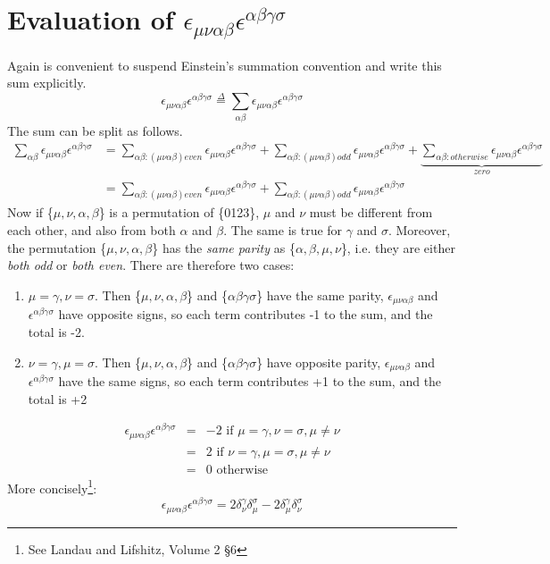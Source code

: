 \documentclass[10pt,a4paper]{article}
\begin{document}
	\section{Evaluation of $\epsilon_{\mu\nu\alpha\beta}\epsilon^{\alpha\beta\gamma\sigma}$}
	Again is convenient to suspend Einstein's summation convention and write this sum explicitly.
	$$
	\epsilon_{\mu\nu\alpha\beta}\epsilon^{\alpha\beta\gamma\sigma}\overset{\Delta}{=}\sum_{\alpha\beta}\epsilon_{\mu\nu\alpha\beta}\epsilon^{\alpha\beta\gamma\sigma}
	$$
	The sum can be split as follows.
	\begin{align*}
	\sum_{\alpha\beta}\epsilon_{\mu\nu\alpha\beta}\epsilon^{\alpha\beta\gamma\sigma} &= \sum_{\alpha\beta: (\mu\nu\alpha\beta) even}\epsilon_{\mu\nu\alpha\beta}\epsilon^{\alpha\beta\gamma\sigma}
	+ \sum_{\alpha\beta: (\mu\nu\alpha\beta) odd}\epsilon_{\mu\nu\alpha\beta}\epsilon^{\alpha\beta\gamma\sigma}
	+ \underbrace{\sum_{\alpha\beta: otherwise}\epsilon_{\mu\nu\alpha\beta}\epsilon^{\alpha\beta\gamma\sigma}}_{zero}\\
	&= \sum_{\alpha\beta: (\mu\nu\alpha\beta) even}\epsilon_{\mu\nu\alpha\beta}\epsilon^{\alpha\beta\gamma\sigma}
	+ \sum_{\alpha\beta: (\mu\nu\alpha\beta) odd}\epsilon_{\mu\nu\alpha\beta}\epsilon^{\alpha\beta\gamma\sigma}
	\end{align*}
	Now if \{$\mu,\nu,\alpha,\beta$\} is a permutation of \{0123\}, $\mu$ and $\nu$ must be different from each other, and also from both $\alpha$ and  $\beta$. The same is true for $\gamma$ and $\sigma$. Moreover,  the permutation  \{$\mu,\nu,\alpha,\beta$\} has the \emph{same parity} as \{$\alpha,\beta,\mu,\nu$\}, i.e. they are either \emph{both odd} or \emph{both even}. There are therefore two cases:
	\begin{enumerate}
		\item $\mu=\gamma,\nu=\sigma$. Then \{$\mu,\nu,\alpha,\beta$\} and \{$\alpha\beta\gamma\sigma$\} have the same parity, $\epsilon_{\mu\nu\alpha\beta}$ and $\epsilon^{\alpha\beta\gamma\sigma}$ have opposite signs, so each term contributes -1 to the sum, and the total is -2.
		\item $\nu=\gamma,\mu=\sigma$. Then \{$\mu,\nu,\alpha,\beta$\} and \{$\alpha\beta\gamma\sigma$\} have opposite parity, $\epsilon_{\mu\nu\alpha\beta}$ and $\epsilon^{\alpha\beta\gamma\sigma}$ have the same signs, so each term contributes +1 to the sum, and the total is +2 
	\end{enumerate}
	
	\begin{align*}
	\epsilon_{\mu\nu\alpha\beta}\epsilon^{\alpha\beta\gamma\sigma}&= &-2 \text{ if } \mu=\gamma,\nu=\sigma, \mu \neq \nu \\
	&= &2 \text{ if }  \nu=\gamma,\mu=\sigma, \mu \neq \nu \\
	&= &0 \text{ otherwise }
	\end{align*}
	More concisely\footnote{See Landau and Lifshitz, Volume 2 \S6}:
	\begin{equation}
	\epsilon_{\mu\nu\alpha\beta}\epsilon^{\alpha\beta\gamma\sigma}=2\delta_{\nu}^{\gamma}\delta_{\mu}^{\sigma} - 2 \delta_{\mu}^{\gamma}\delta_{\nu}^{\sigma}
	\end{equation}
	
\end{document}
